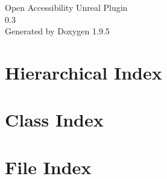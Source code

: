 \documentclass[twoside]{book}
\newcommand{\+}{\discretionary{\mbox{\scriptsize$\hookleftarrow$}}{}{}}
\newcommand{\clearemptydoublepage}{%
    \newpage{\pagestyle{empty}\cleardoublepage}%
  }
\begin{document}
  \raggedbottom
    \hypersetup{pageanchor=false,
                bookmarksnumbered=true,
                pdfencoding=unicode
               }
  \begin{titlepage}
  \vspace*{7cm}
  \begin{center}%
  {\Large Open Accessibility Unreal Plugin}\\
  [1ex]\large 0.\+3 \\
  \vspace*{1cm}
  {\large Generated by Doxygen 1.9.5}\\
  \end{center}
  \end{titlepage}
  \clearemptydoublepage
  \tableofcontents
  \clearemptydoublepage
  \hypersetup{pageanchor=true}
\chapter{Hierarchical Index}

\chapter{Class Index}

\chapter{File Index}

\end{document}

